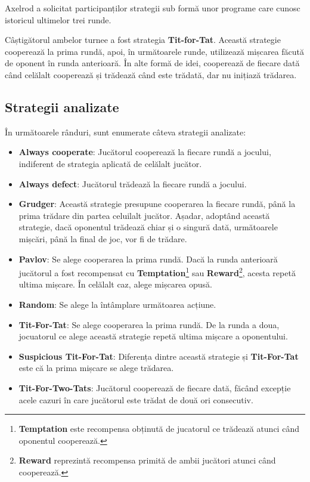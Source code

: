 Axelrod a solicitat participanților strategii sub formă unor programe care cunosc istoricul ultimelor trei runde.

Câștigătorul ambelor turnee a fost strategia \textbf{Tit-for-Tat}. Această strategie cooperează la prima rundă, apoi, în următoarele runde, utilizează mișcarea făcută de oponent în runda anterioară. În alte formă de idei, cooperează de fiecare dată când celălalt cooperează și trădează când este trădată, dar nu inițiază trădarea.

\clearpage

\subsection{Strategii analizate}

În următoarele rânduri, sunt enumerate câteva strategii analizate:

\begin{itemize}  
	\item \textbf{Always cooperate}: Jucătorul cooperează la fiecare rundă a jocului, indiferent de strategia aplicată de celălalt jucător. 
	\item \textbf{Always defect}: Jucătorul trădează la fiecare rundă a jocului. 
	\item \textbf{Grudger}: Această strategie presupune cooperarea la fiecare rundă, până la prima trădare din partea celuilalt jucător. Așadar, adoptând această strategie, dacă oponentul trădează chiar și o singură dată, următoarele mișcări, până la final de joc, vor fi de trădare. 
	\item \textbf{Pavlov}: Se alege cooperarea la prima rundă. Dacă la runda anterioară jucătorul a fost recompensat cu \textbf{Temptation}\footnote{\textbf{Temptation} este recompensa obținută de jucatorul ce trădează atunci când oponentul cooperează.} sau \textbf{Reward}\footnote{\textbf{Reward} reprezintă recompensa primită de ambii jucători atunci când cooperează.}, acesta repetă ultima mișcare. În celălalt caz, alege mișcarea opusă. 
	\item \textbf{Random}: Se alege la întâmplare următoarea acțiune. 
	\item \textbf{Tit-For-Tat}: Se alege cooperarea la prima rundă. De la runda a doua, jocuatorul ce alege această strategie repetă ultima mișcare a oponentului. 
	\item \textbf{Suspicious Tit-For-Tat}: Diferența dintre această strategie și \textbf{Tit-For-Tat} este că la prima mișcare se alege trădarea. 
	\item \textbf{Tit-For-Two-Tats}:  Jucătorul cooperează de fiecare dată, făcând excepție acele cazuri în care jucătorul este trădat de două ori consecutiv. 
\end{itemize}  

